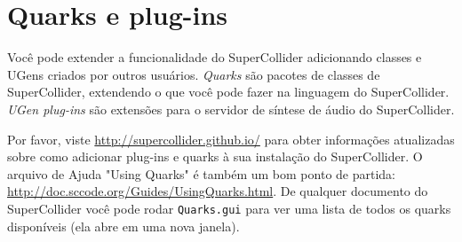 \section{Quarks e plug-ins}

Você pode extender a funcionalidade do SuperCollider adicionando classes e UGens criados por outros usuários. \emph{Quarks} são pacotes de classes de SuperCollider, extendendo o que você pode fazer na linguagem do SuperCollider. \emph{UGen plug-ins} são extensões para o servidor de síntese de áudio do SuperCollider.

Por favor, viste \url{http://supercollider.github.io/} para obter informações atualizadas sobre como adicionar plug-ins e quarks à sua instalação do SuperCollider. O arquivo de Ajuda "Using Quarks" é também um bom ponto de partida: \url{http://doc.sccode.org/Guides/UsingQuarks.html}. De qualquer documento do SuperCollider você pode rodar \texttt{Quarks.gui} para ver uma lista de todos os quarks disponíveis (ela abre em uma nova janela).
